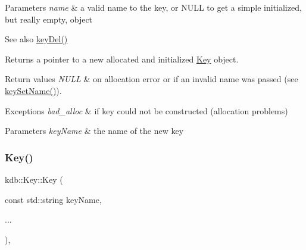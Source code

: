 \begin{DoxyParams}{Parameters}
{\em name} & a valid name to the key, or N\+U\+LL to get a simple initialized, but really empty, object \\
\hline
\end{DoxyParams}
\begin{DoxySeeAlso}{See also}
\mbox{\hyperlink{group__key_ga3df95bbc2494e3e6703ece5639be5bb1}{key\+Del()}} 
\end{DoxySeeAlso}
\begin{DoxyReturn}{Returns}
a pointer to a new allocated and initialized \mbox{\hyperlink{classkdb_1_1Key}{Key}} object. 
\end{DoxyReturn}

\begin{DoxyRetVals}{Return values}
{\em N\+U\+LL} & on allocation error or if an invalid {\ttfamily name} was passed (see \mbox{\hyperlink{group__keyname_ga7699091610e7f3f43d2949514a4b35d9}{key\+Set\+Name()}}).\\
\hline
\end{DoxyRetVals}

\begin{DoxyExceptions}{Exceptions}
{\em bad\+\_\+alloc} & if key could not be constructed (allocation problems)\\
\hline
\end{DoxyExceptions}

\begin{DoxyParams}{Parameters}
{\em key\+Name} & the name of the new key \\
\hline
\end{DoxyParams}
\mbox{\label{classkdb_1_1Key_acbf7642258d46da2c4427f4104cf01ee}} 
\subsubsection{\texorpdfstring{Key()}{Key()}\hspace{0.1cm}{\footnotesize\ttfamily [6/7]}}
{\footnotesize\ttfamily kdb\+::\+Key\+::\+Key (\begin{DoxyParamCaption}\item[{const std\+::string}]{key\+Name,  }\item[{}]{... }\end{DoxyParamCaption})\hspace{0.3cm}{\ttfamily [inline]}, {\ttfamily [explicit]}}



